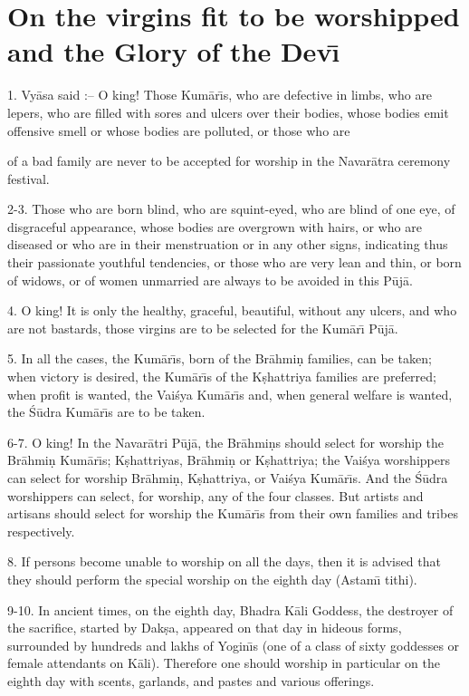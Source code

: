 \chapter{On the virgins fit to be worshipped and the Glory of the Dev\={\i}}

1. Vy\=asa said :-- O king! Those Kum\=ar\={\i}s, who are defective in limbs, who are lepers, who are filled with sores and ulcers over their bodies, whose bodies emit offensive smell or whose bodies are polluted, or those who are

of a bad family are never to be accepted for worship in the Navar\=atra ceremony festival.

2-3. Those who are born blind, who are squint-eyed, who are blind of one eye, of disgraceful appearance, whose bodies are overgrown with hairs, or who are diseased or who are in their menstruation or in any other signs, indicating thus their passionate youthful tendencies, or those who are very lean and thin, or born of widows, or of women unmarried are always to be avoided in this P\=uj\=a.

4. O king! It is only the healthy, graceful, beautiful, without any ulcers, and who are not bastards, those virgins are to be selected for the Kum\=ar\={\i} P\=uj\=a.

5. In all the cases, the Kum\=ar\={\i}s, born of the Br\=ahmi\d{n} families, can be taken; when victory is desired, the Kum\=ar\={\i}s of the K\d{s}hattriya families are preferred; when profit is wanted, the Vai\'sya Kum\=ar\={\i}s and, when general welfare is wanted, the \'S\=udra Kum\=ar\={\i}s are to be taken.

6-7. O king! In the Navar\=atri P\=uj\=a, the Br\=ahmi\d{n}s should select for worship the Br\=ahmi\d{n} Kum\=ar\={\i}s; K\d{s}hattriyas, Br\=ahmi\d{n} or K\d{s}hattriya; the Vai\'sya worshippers can select for worship Br\=ahmi\d{n}, K\d{s}hattriya, or Vai\'sya Kum\=ar\={\i}s. And the \'S\=udra worshippers can select, for worship, any of the four classes. But artists and artisans should select for worship the Kum\=ar\={\i}s from their own families and tribes respectively.

8. If persons become unable to worship on all the days, then it is advised that they should perform the special worship on the eighth day (Astam\={\i} tithi).

9-10. In ancient times, on the eighth day, Bhadra K\=ali Goddess, the destroyer of the sacrifice, started by Dak\d{s}a, appeared on that day in hideous forms, surrounded by hundreds and lakhs of Yogin\={\i}s (one of a class of sixty goddesses or female attendants on K\=ali). Therefore one should worship in particular on the eighth day with scents, garlands, and pastes and various offerings.

